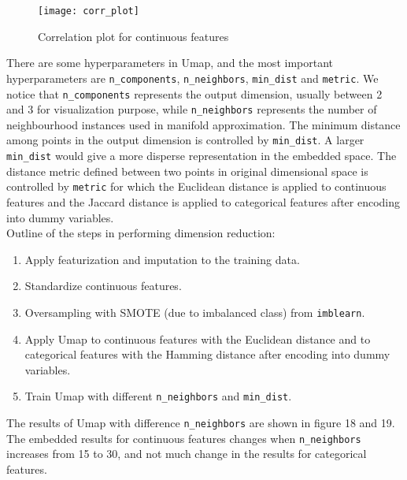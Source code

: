 \documentclass[12pt]{article}
\begin{document}
\begin{figure}[h]
\centering
\texttt{[image: corr\_plot]}
\caption{Correlation plot for continuous features}
\end{figure}

\newpage 
There are some hyperparameters in Umap, and the most important hyperparameters are \texttt{n\_components}, \texttt{n\_neighbors}, \texttt{min\_dist} and \texttt{metric}. We notice that \texttt{n\_components} represents the output dimension, usually between 2 and 3 for visualization purpose, while \texttt{n\_neighbors} represents the number of neighbourhood instances used in manifold approximation. The minimum distance among points in the output dimension is controlled by \texttt{min\_dist}. A larger \texttt{min\_dist} would give a more disperse representation in the embedded space. The distance metric defined between two points in original dimensional space is controlled by \texttt{metric} for which the Euclidean distance is applied to continuous features and the Jaccard distance is applied to categorical features after encoding into dummy variables.\\

Outline of the steps in performing dimension reduction:

\begin{enumerate}

\item Apply featurization and imputation to the training data.

\item Standardize continuous features.

\item Oversampling with SMOTE (due to imbalanced class) from \texttt{imblearn}.

\item Apply Umap to continuous features with the Euclidean distance and to categorical features with the Hamming distance after encoding into dummy variables. 

\item Train Umap with different \texttt{n\_neighbors} and \texttt{min\_dist}.

\end{enumerate}

The results of Umap with difference \texttt{n\_neighbors} are shown in figure 18 and 19. The embedded results for continuous features changes when \texttt{n\_neighbors} increases from 15 to 30, and not much change in the results for categorical features.
\end{document}
